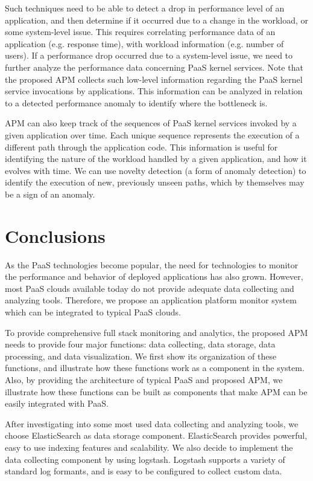 \documentclass[11pt]{article}
\begin{document}
Such techniques need to be able to detect a drop in performance level of an application, and then
determine if it occurred due to a change in the workload, or some system-level issue. This requires
correlating performance data of an application (e.g. response time), with workload information (e.g. number
of users). If a performance drop
occurred due to a system-level issue, we need to further analyze the performance data concerning
PaaS kernel services. Note that the proposed APM collects such low-level information regarding
the PaaS kernel service invocations by applications. This information can be analyzed in relation 
to a detected performance anomaly to identify where the bottleneck is.

APM can also keep track of the sequences of PaaS kernel services invoked by a given application over time.
Each unique sequence represents the execution of a different path through the application code. 
This information is useful for
identifying the nature of the workload handled by a given application, and how it evolves with time. 
We can use novelty detection (a form of anomaly detection) to identify the execution of new, previously
unseen paths, which by themselves may be a sign of an anomaly.

\section{Conclusions}
As the PaaS technologies become popular, the need for technologies to monitor the performance and behavior of
deployed applications has also grown. However, most PaaS clouds available today do not provide adequate
data collecting and analyzing tools. Therefore, we propose an application platform monitor system which can be
integrated to typical PaaS clouds.

To provide comprehensive full stack monitoring and analytics, the proposed APM needs to provide four major functions:
data collecting, data storage, data processing, and data visualization. We first show its organization of
these functions, and illustrate how these functions work as a component in the system. Also, by providing the
architecture of typical PaaS and proposed APM, we illustrate how these functions can be built as components that
make APM can be easily integrated with PaaS.

After investigating into some most used data collecting and analyzing tools, we choose ElasticSearch as data storage
component. ElasticSearch provides powerful, easy to use indexing features and scalability. We also decide to
implement the data collecting component by using logstash. Logstash supports a variety of standard log formants,
and is easy to be configured to collect custom data.
\end{document}
